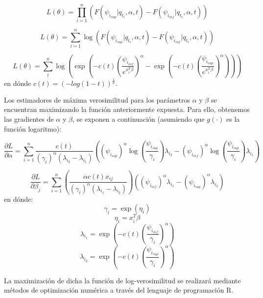 \[L\left( \theta\right)=\prod_{i=1}^{n}\left( F(\psi_{i_{sup}}|q_{t_{i}},\alpha,t) - F(\psi_{i_{inf}}|q_{t_{i}},\alpha,t) \right) \]

\[L(\theta)=\sum_{i=1}^{n} \log \left( F(\psi_{i_{sup}}|q_{t_{i}},\alpha,t) - F\left( \psi_{i_{inf}}|q_{t_{i}},\alpha,t \right) \right)\]

\[L(\theta)=\sum_{i}^{n} \log \left( \exp\left( -c(t)\left( \frac{\psi_{i_{inf}}}{e^{x_{i}^{T}\beta}} \right)^{\alpha} - \exp\left( -c(t)\left( \frac{\psi_{i_{sup}}}{e^{x_{i}^{T}\beta}} \right)^{\alpha} \right) \right) \right)\]
\noindent en dónde $c(t)=(-log(1-t))^{\frac{1}{\alpha}}$.

Los estimadores de máxima verosimilitud para los parámetros $\alpha$ y $\beta$ se encuentran maximizando la función anteriormente expuesta. Para ello, obtenemos las gradientes de $\alpha$ y $\beta$, se exponen a continuación (asumiendo que $g(\cdot)$ es la función logaritmo):

\[\frac{\partial L}{\partial \alpha}=\sum_{i=1}^{n} \frac{c(t)}{(\gamma_{i})^{\alpha}(\lambda_{i_{2}}-\lambda_{i_{1}})}\left( (\psi_{i_{sup}})^{\alpha} \log\left( \frac{\psi_{i_{sup}}}{\gamma_{i}} \right) \lambda_{i_{2}} - (\psi_{i_{inf}})^{\alpha} \log\left( \frac{\psi_{i_{sup}}}{\gamma_{i}} \right) \lambda_{i_{1}}\right)\]

\[\frac{\partial L}{\partial \beta_{j}}=\sum_{i=1}^{n} \left(\frac{\alpha c(t) x_{ij}}{(\gamma_{i})^{\alpha}(\lambda_{i_{1}}-\lambda_{i_{2}})}\right) \left( (\psi_{i_{inf}})^{\alpha}\lambda_{i_{1}} - (\psi_{i_{sup}})^{\alpha} \lambda_{i_{2}} \right)\]
\noindent en dónde:
\[ \gamma_{i} = \exp(\eta_{i})\]
\[ \eta_{i} = x_{i}^{T}\beta\]
\[ \lambda_{i_{1}} = \exp\left( -c(t) \left(\frac{\psi_{i_{inf}}}{\gamma_{i}}\right)^{\alpha} \right)\]
\[ \lambda_{i_{2}} = \exp\left( -c(t) \left(\frac{\psi_{i_{sup}}}{\gamma_{i}}\right)^{\alpha} \right)\]

La maximización de dicha la función de log-verosimilitud se realizará mediante métodos de optimización numérica a través del lenguaje de programación R.
	